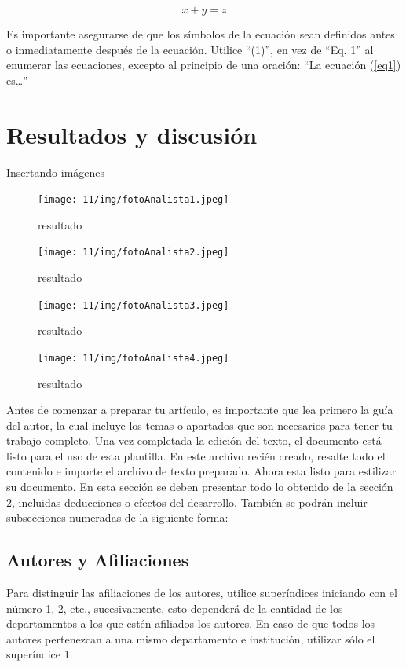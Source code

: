     \begin{equation}
        \label{eq1}
        x + y = z 
    \end{equation}
    
    Es importante asegurarse de que los símbolos de la ecuación sean definidos antes o inmediatamente después de la ecuación. Utilice “(1)”, en vez de “Eq. 1” al enumerar las ecuaciones, excepto al principio de una oración: “La ecuación (\ref{eq1}) es…”
    
    \section{Resultados y discusión}
    \begin{frame}{Insertando imágenes}
        \begin{figure}
            \centering
            \texttt{[image: 11/img/fotoAnalista1.jpeg]}
            \caption{resultado}
            \label{fig:enter-label}
             \centering
            \texttt{[image: 11/img/fotoAnalista2.jpeg]}
            \caption{resultado}
            \label{fig:enter-label}
             \centering
            \texttt{[image: 11/img/fotoAnalista3.jpeg]}
            \caption{resultado}
            \label{fig:enter-label}
             \centering
            \texttt{[image: 11/img/fotoAnalista4.jpeg]}
            \caption{resultado}
            \label{fig:enter-label}
        \end{figure}
    \end{frame}
    Antes de comenzar a preparar tu artículo, es importante que lea primero la guía del autor, la cual incluye los temas o apartados que son necesarios para tener tu trabajo completo.
    Una vez completada la edición del texto, el documento está listo para el uso de esta plantilla. En este archivo recién creado, resalte todo el contenido e importe el archivo de texto preparado. Ahora esta listo para estilizar su documento.
    En esta sección se deben presentar todo lo obtenido de la sección 2, incluidas deducciones o efectos del desarrollo. También se podrán incluir subsecciones numeradas de la siguiente forma:
    
    \subsection{Autores y Afiliaciones}
    
    Para distinguir las afiliaciones de los autores, utilice superíndices iniciando con el número 1, 2, etc., sucesivamente, esto dependerá de la cantidad de los departamentos a los que estén afiliados los autores. En caso de que todos los autores pertenezcan a una mismo departamento e institución, utilizar sólo el superíndice 1. 
    
